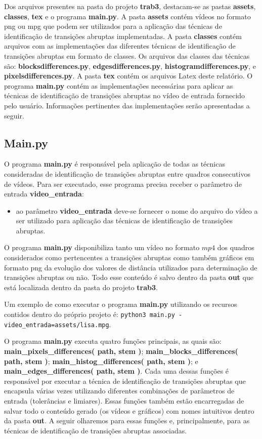\documentclass{article}
\begin{document}
Dos arquivos presentes na pasta do projeto \textbf{trab3}, destacam-se as pastas \textbf{assets}, \textbf{classes}, \textbf{tex} e o programa \textbf{main.py}. A pasta \textbf{assets} contém vídeos no formato png ou mpg que podem ser utilizados para a aplicação das técnicas de identificação de transições abruptas implementadas. A pasta \textbf{classes} contém arquivos com as implementações das diferentes técnicas de identificação de transições abruptas em formato de classes. Os arquivos das classes das técnicas são: \textbf{blocksdifferences.py}, \textbf{edgesdifferences.py}, \textbf{histogramdifferences.py}, e \textbf{pixelsdifferences.py}. A pasta \textbf{tex} contém os arquivos Latex deste relatório. O programa \textbf{main.py} contém as implementações necessárias para aplicar as técnicas de identificação de transições abruptas no vídeo de entrada fornecido pelo usuário. Informações pertinentes das implementações serão apresentadas a seguir.

%
\subsection{Main.py}
O programa \textbf{main.py} é responsável pela aplicação de todas as técnicas consideradas de identificação de transições abruptas entre quadros consecutivos de vídeos. Para ser executado, esse programa precisa receber o parâmetro de entrada \textbf{video\_entrada}:

\begin{itemize}
	\item ao parâmetro \textbf{video\_entrada} deve-se fornecer o nome do arquivo do vídeo a ser utilizado para aplicação das técnicas de identificação de transições abruptas.
\end{itemize}
	
\noindent 
O programa \textbf{main.py} disponibiliza tanto um vídeo no formato $mp4$ dos quadros considerados como pertencentes a transições abruptas como também gráficos em formato png da evolução dos valores de distância utilizados para determinação de transições abruptas ou não. Todo esse conteúdo é salvo dentro da pasta \textbf{out} que está localizada dentro da pasta do projeto \textbf{trab3}.

Um exemplo de como executar o programa \textbf{main.py} utilizando os recursos contidos dentro do próprio projeto é: \lstinline{python3 main.py -video_entrada=assets/lisa.mpg}.

O programa \textbf{main.py} executa quatro funções principais, as quais são: \textbf{main\_pixels\_differences( path, stem )}; \textbf{main\_blocks\_differences( path, stem )}; \textbf{main\_histog\_differences( path, stem )}; e \textbf{main\_edges\_differences( path, stem )}. Cada uma dessas funções é responsável por executar a técnica de identificação de transições abruptas que encapsula várias vezes utilizando diferentes combinações de parâmetros de entrada (tolerâncias e limiares). Essas funções também estão encarregadas de salvar todo o conteúdo gerado (os vídeos e gráficos) com nomes intuitivos dentro da pasta \textbf{out}. A seguir olharemos para essas funções e, principalmente, para as técnicas de identificação de transições abruptas associadas.
\end{document}
